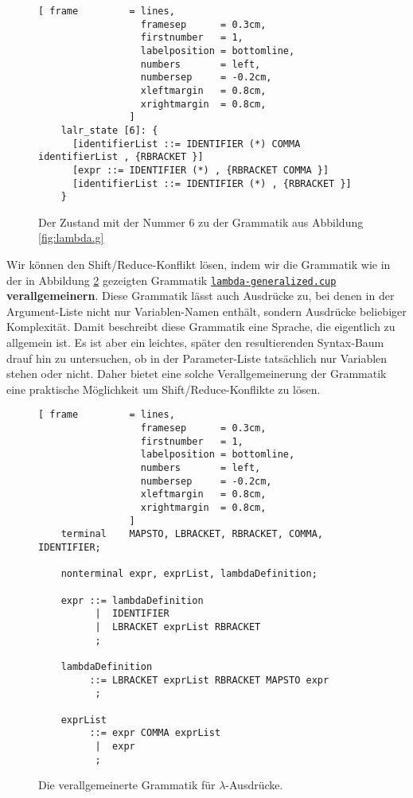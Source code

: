 \begin{figure}[!ht]
\centering
\begin{Verbatim}[ frame         = lines, 
                  framesep      = 0.3cm, 
                  firstnumber   = 1,
                  labelposition = bottomline,
                  numbers       = left,
                  numbersep     = -0.2cm,
                  xleftmargin   = 0.8cm,
                  xrightmargin  = 0.8cm,
                ]
    lalr_state [6]: {
      [identifierList ::= IDENTIFIER (*) COMMA identifierList , {RBRACKET }]
      [expr ::= IDENTIFIER (*) , {RBRACKET COMMA }]
      [identifierList ::= IDENTIFIER (*) , {RBRACKET }]
    }
\end{Verbatim}
 \vspace*{-0.3cm}
\caption{Der Zustand mit der Nummer 6 zu der Grammatik aus Abbildung \ref{fig:lambda.g}}
\label{fig:lambda.g:state6}
\end{figure}

Wir k\"onnen den Shift/Reduce-Konflikt l\"osen, indem wir die Grammatik wie in der in Abbildung
\ref{fig:lambda-generalized.cup} gezeigten Grammatik
\href{https://github.com/karlstroetmann/Formal-Languages/tree/master/Cup/LambdaExpr/lambda-generalized.cup}{\texttt{lambda-generalized.cup}}
 \textbf{verallgemeinern}.  Diese Grammatik l\"asst auch
Ausdr\"ucke zu, bei denen in der Argument-Liste nicht nur Variablen-Namen enth\"alt, sondern Ausdr\"ucke
beliebiger Komplexit\"at.  Damit beschreibt diese Grammatik eine Sprache, die eigentlich zu allgemein
ist.  Es ist aber ein leichtes, sp\"ater den resultierenden Syntax-Baum drauf hin zu untersuchen, ob
in der Parameter-Liste tats\"achlich nur Variablen stehen oder nicht.  Daher bietet eine solche
Verallgemeinerung der Grammatik eine praktische M\"oglichkeit um Shift/Reduce-Konflikte zu l\"osen.

\begin{figure}[!ht]
\centering
\begin{Verbatim}[ frame         = lines, 
                  framesep      = 0.3cm, 
                  firstnumber   = 1,
                  labelposition = bottomline,
                  numbers       = left,
                  numbersep     = -0.2cm,
                  xleftmargin   = 0.8cm, 
                  xrightmargin  = 0.8cm,
                ]
    terminal    MAPSTO, LBRACKET, RBRACKET, COMMA, IDENTIFIER;
    
    nonterminal expr, exprList, lambdaDefinition;
    
    expr ::= lambdaDefinition
          |  IDENTIFIER  
          |  LBRACKET exprList RBRACKET
          ;
    
    lambdaDefinition
         ::= LBRACKET exprList RBRACKET MAPSTO expr
          ;
    
    exprList
         ::= expr COMMA exprList
          |  expr
          ;
\end{Verbatim}
\vspace*{-0.3cm}
\caption{Die verallgemeinerte Grammatik f\"ur $\lambda$-Ausdr\"ucke.}
\label{fig:lambda-generalized.cup}
\end{figure}
\vspace*{\fill}


